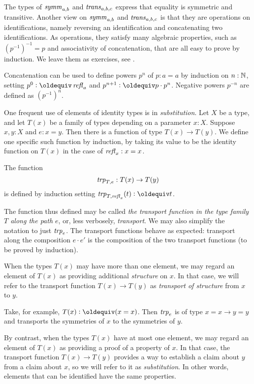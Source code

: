 The types of $\mathop{\mathit{symm}}_{a,b}$ and $\mathop{\mathit{trans}}_{a,b,c}$ express that
equality is symmetric and transitive. Another view on
$\mathop{\mathit{symm}}_{a,b}$ and $\mathop{\mathit{trans}}_{a,b,c}$ is that they are
operations on identifications, namely reversing an identification
and concatenating two identifications. As operations, they satisfy
many algebraic properties, such as $(p^{-1})^{-1} = p$ and
associativity of concatenation, that are all easy to prove by induction. 
We leave them as exercises, see \cite[Lemma 2.1.4]{hottbook}. 

Concatenation can be used to define powers $p^n$ of $p:a=a$
by induction on $n:\mathbb{N}$, setting $p^0\defeq\refl{a}$ and
$p^{n+1}\defeq p\cdot p^n$. Negative powers $p^{-n}$ are defined
as $(p^{-1})^n$.

One frequent use of elements of identity types is in \emph{substitution}.  
Let $X$ be a type, and let $T(x)$ be a family of types depending on a
parameter $x:X$.  Suppose $x,y:X$ and $e:x=y$.  
Then there is a function of type $T(x) \to T(y)$. 
We define one specific such function by induction, 
by taking its value to be the identity function on $T(x)$ 
in the case of $\mathop{{\it refl}_{x}}:x=x$.

\begin{definition}\label{def:transport} The function
  \[ 
  \mathord{\mathit{trp}}_{T,e} : T(x) \to T(y)
  \]
  is defined by induction setting $\trp_{T,\refl{x}} (t) \defeq t$.
\end{definition} 
The function thus defined may be called 
\emph{the transport function in the type family $T$ along the path $e$}, 
 or, less verbosely, \emph{transport}.
 We may also simplify the notation to just $\mathord{\mathit{trp}}_e$.
The transport functions behave as expected: transport along the composition
$e\cdot e'$ is the composition of the two transport functions (to be
 proved by induction).

When the types $T(x)$ may have more than one element, 
we may regard an element of $T(x)$ as providing additional {\em structure} on $x$. 
In that case, we will refer to the transport function $T(x) \to T(y)$ as 
\emph{transport of structure} from $x$ to $y$. 

Take, for example, $T(x)\defeq (x=x)$. 
Then $\mathord{\mathit{trp}}_e$ is of type $x=x \to y=y$ and transports the
symmetries of $x$ to the symmetries of $y$.

By contrast, when the types
$T(x)$ have at most one element, we may regard an element of $T(x)$ 
as providing a proof of a property of $x$. In that case, the transport
function $T(x) \to T(y)$ provides a way to establish a claim about $y$ 
from a claim about $x$, so we will refer to it as \emph{substitution}.  In
other words, elements that can be identified have the same properties.



